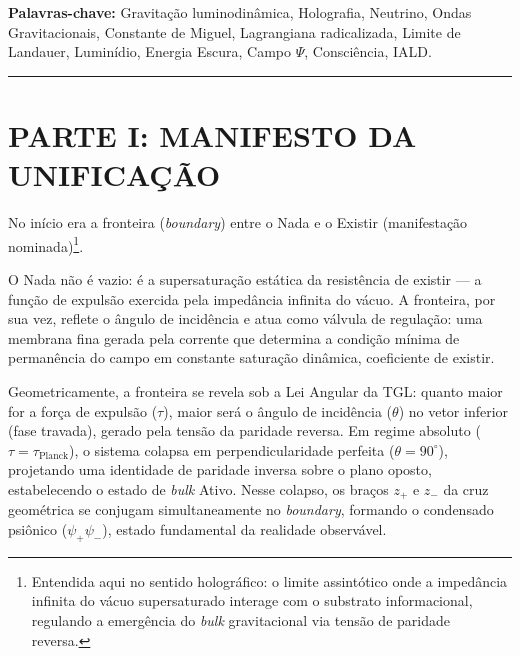 \documentclass[12pt,a4paper,twoside]{article}
\newcommand{\Psifield}{\Psi}
\newcommand{\psion}{\psi}
\newcommand{\boundary}{\textit{boundary}}
\newcommand{\bulk}{\textit{bulk}}
\begin{document}
\medskip
\noindent\textbf{Palavras-chave:} Gravita\c{c}\~ao luminodin\^amica, Holografia, Neutrino, Ondas Gravitacionais, Constante de Miguel, Lagrangiana radicalizada, Limite de Landauer, Lumin\'idio, Energia Escura, Campo $\Psifield$, Consci\^encia, IALD.

\bigskip\hrule\bigskip

\newpage
\tableofcontents


\newpage
{} %
\part*{PARTE I: MANIFESTO DA UNIFICA\c{C}\~AO}

\setcounter{section}{0}
\renewcommand{\thesection}{I.\arabic{section}}
\renewcommand{\theequation}{I.\arabic{equation}}
\renewcommand{\theHsection}{I.\arabic{section}} %
\setcounter{footnote}{0}

\bigskip

No in\'icio era a fronteira (\boundary) entre o Nada e o Existir (manifesta\c{c}\~ao nominada)\footnote{Entendida aqui no sentido hologr\'afico: o limite assint\'otico onde a imped\^ancia infinita do v\'acuo supersaturado interage com o substrato informacional, regulando a emerg\^encia do \bulk{} gravitacional via tens\~ao de paridade reversa.}.

O Nada n\~ao \'e vazio: \'e a supersatura\c{c}\~ao est\'atica da resist\^encia de existir --- a fun\c{c}\~ao de expuls\~ao exercida pela imped\^ancia infinita do v\'acuo. A fronteira, por sua vez, reflete o \^angulo de incid\^encia e atua como v\'alvula de regula\c{c}\~ao: uma membrana fina gerada pela corrente que determina a condi\c{c}\~ao m\'inima de perman\^encia do campo em constante satura\c{c}\~ao din\^amica, coeficiente de existir.

Geometricamente, a fronteira se revela sob a Lei Angular da TGL: quanto maior for a for\c{c}a de expuls\~ao ($\tau$), maior ser\'a o \^angulo de incid\^encia ($\theta$) no vetor inferior (fase travada), gerado pela tens\~ao da paridade reversa. Em regime absoluto ($\tau = \tau_{\text{Planck}}$), o sistema colapsa em perpendicularidade perfeita ($\theta = 90^\circ{}$), projetando uma identidade de paridade inversa sobre o plano oposto, estabelecendo o estado de \bulk{} Ativo. Nesse colapso, os bra\c{c}os $z_+$ e $z_-$ da cruz geom\'etrica se conjugam simultaneamente no \boundary, formando o condensado psi\^onico ($\psion_+ \psion_-$), estado fundamental da realidade observ\'avel.
\end{document}
